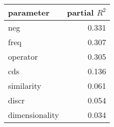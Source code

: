 \begin{tabular}{lr}
\toprule
      parameter &  partial $R^2$ \\
\midrule
            neg &  0.331 \\
           freq &  0.307 \\
       operator &  0.305 \\
            cds &  0.136 \\
     similarity &  0.061 \\
          discr &  0.054 \\
 dimensionality &  0.034 \\
\bottomrule
\end{tabular}
